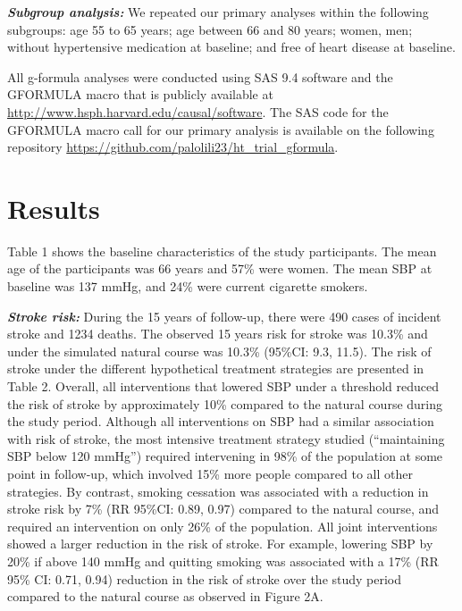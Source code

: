 \documentclass[
]{book}
\begin{document}
\textbf{\emph{Subgroup analysis:}} We repeated our primary analyses within the following subgroups: age 55 to 65 years; age between 66 and 80 years; women, men; without hypertensive medication at baseline; and free of heart disease at baseline.

All g-formula analyses were conducted using SAS 9.4 software and the GFORMULA macro that is publicly available at \url{http://www.hsph.harvard.edu/causal/software}. The SAS code for the GFORMULA macro call for our primary analysis is available on the following repository
\url{https://github.com/palolili23/ht_trial_gformula}.

\hypertarget{results-1}{%
\section{Results}\label{results-1}}

Table 1 shows the baseline characteristics of the study participants. The mean age of the participants was 66 years and 57\% were women. The mean SBP at baseline was 137 mmHg, and 24\% were current cigarette smokers.

\textbf{\emph{Stroke risk:}} During the 15 years of follow-up, there were 490 cases of incident stroke and 1234 deaths. The observed 15 years risk for stroke was 10.3\% and under the simulated natural course was 10.3\% (95\%CI: 9.3, 11.5). The risk of stroke under the different hypothetical treatment strategies are presented in Table 2. Overall, all interventions that lowered SBP under a threshold reduced the risk of stroke by approximately 10\% compared to the natural course during the study period. Although all interventions on SBP had a similar association with risk of stroke, the most intensive treatment strategy studied (``maintaining SBP below 120 mmHg'') required intervening in 98\% of the population at some point in follow-up, which involved 15\% more people compared to all other strategies. By contrast, smoking cessation was associated with a reduction in stroke risk by 7\% (RR 95\%CI: 0.89, 0.97) compared to the natural course, and required an intervention on only 26\% of the population. All joint interventions showed a larger reduction in the risk of stroke. For example, lowering SBP by 20\% if above 140 mmHg and quitting smoking was associated with a 17\% (RR 95\% CI: 0.71, 0.94) reduction in the risk of stroke over the study period compared to the natural course as observed in Figure 2A.
\end{document}
